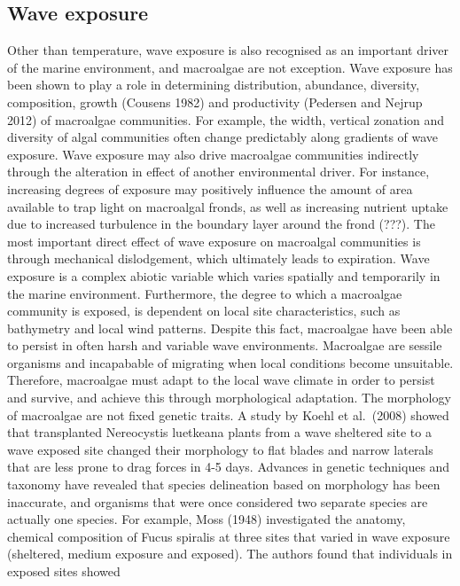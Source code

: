 \documentclass[]{article}
\begin{document}
\hypertarget{wave-exposure}{%
\subsection{Wave exposure}\label{wave-exposure}}

Other than temperature, wave exposure is also recognised as an important
driver of the marine environment, and macroalgae are not exception. Wave
exposure has been shown to play a role in determining distribution,
abundance, diversity, composition, growth (Cousens 1982) and
productivity (Pedersen and Nejrup 2012) of macroalgae communities. For
example, the width, vertical zonation and diversity of algal communities
often change predictably along gradients of wave exposure. Wave exposure
may also drive macroalgae communities indirectly through the alteration
in effect of another environmental driver. For instance, increasing
degrees of exposure may positively influence the amount of area
available to trap light on macroalgal fronds, as well as increasing
nutrient uptake due to increased turbulence in the boundary layer around
the frond (???). The most important direct effect of wave exposure on
macroalgal communities is through mechanical dislodgement, which
ultimately leads to expiration. Wave exposure is a complex abiotic
variable which varies spatially and temporarily in the marine
environment. Furthermore, the degree to which a macroalgae community is
exposed, is dependent on local site characteristics, such as bathymetry
and local wind patterns. Despite this fact, macroalgae have been able to
persist in often harsh and variable wave environments. Macroalgae are
sessile organisms and incapabable of migrating when local conditions
become unsuitable. Therefore, macroalgae must adapt to the local wave
climate in order to persist and survive, and achieve this through
morphological adaptation. The morphology of macroalgae are not fixed
genetic traits. A study by Koehl et al.~(2008) showed that transplanted
Nereocystis luetkeana plants from a wave sheltered site to a wave
exposed site changed their morphology to flat blades and narrow laterals
that are less prone to drag forces in 4-5 days. Advances in genetic
techniques and taxonomy have revealed that species delineation based on
morphology has been inaccurate, and organisms that were once considered
two separate species are actually one species. For example, Moss (1948)
investigated the anatomy, chemical composition of Fucus spiralis at
three sites that varied in wave exposure (sheltered, medium exposure and
exposed). The authors found that individuals in exposed sites showed
\end{document}
